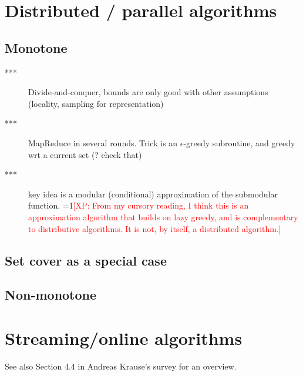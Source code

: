 \documentclass{article}
\newcommand{\Comments}{1}
\newcommand{\note}[2]{\ifnum\Comments=1\textcolor{#1}{#2}\fi}
\newcommand{\xinghao}[1]{\note{red}{[XP: #1]}}
\begin{document}
\section{Distributed / parallel algorithms}

\subsection{Monotone}

\begin{description}
\item[\citet{Mirzasoleiman2013}***] Divide-and-conquer, bounds are only good with other assumptions (locality, sampling for representation)
\item[\citet{kumar13}***] MapReduce in several rounds. Trick is an $\epsilon$-greedy subroutine, and greedy wrt a current set (? check that)
\item[\citet{wei14}***] key idea is a modular (conditional) approximation of the submodular function. \xinghao{From my cursory reading, I think this is an approximation algorithm that builds on lazy greedy, and is complementary to distributive algorithms. It is not, by itself, a distributed algorithm.}
\end{description}

\subsection{Set cover as a special case}

\begin{description}
\item[\citet{blelloch12}] seems to a follow-up of \citep{blelloch11}
\item{\citet{abrams04}] set $k$-cover
\item[\citet{koufog}]
\item[\citet{chierichetti10}] MAP-reduce
\end{description}

\subsection{Non-monotone}



\section{Streaming/online algorithms}

See also Section 4.4 in Andreas Krause's survey for an overview.
\end{document}
